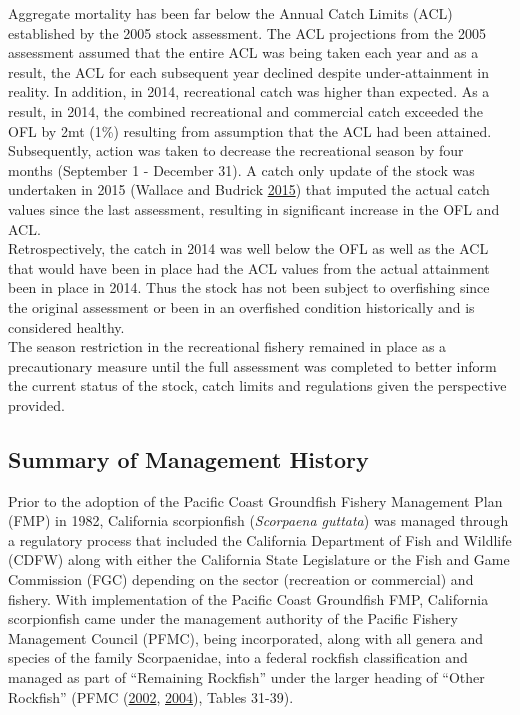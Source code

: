 \documentclass[12pt,]{article}
\begin{document}
Aggregate mortality has been far below the Annual Catch Limits (ACL)
established by the 2005 stock assessment. The ACL projections from the
2005 assessment assumed that the entire ACL was being taken each year
and as a result, the ACL for each subsequent year declined despite
under-attainment in reality. In addition, in 2014, recreational catch
was higher than expected. As a result, in 2014, the combined
recreational and commercial catch exceeded the OFL by 2mt (1\%)
resulting from assumption that the ACL had been attained. Subsequently,
action was taken to decrease the recreational season by four months
(September 1 - December 31). A catch only update of the stock was
undertaken in 2015 (Wallace and Budrick
\protect\hyperlink{ref-Wallace2015}{2015}) that imputed the actual catch
values since the last assessment, resulting in significant increase in
the OFL and ACL.\\
Retrospectively, the catch in 2014 was well below the OFL as well as the
ACL that would have been in place had the ACL values from the actual
attainment been in place in 2014. Thus the stock has not been subject to
overfishing since the original assessment or been in an overfished
condition historically and is considered healthy.\\
The season restriction in the recreational fishery remained in place as
a precautionary measure until the full assessment was completed to
better inform the current status of the stock, catch limits and
regulations given the perspective provided.

\subsection{Summary of Management
History}\label{summary-of-management-history}

Prior to the adoption of the Pacific Coast Groundfish Fishery Management
Plan (FMP) in 1982, California scorpionfish (\emph{Scorpaena guttata})
was managed through a regulatory process that included the California
Department of Fish and Wildlife (CDFW) along with either the California
State Legislature or the Fish and Game Commission (FGC) depending on the
sector (recreation or commercial) and fishery. With implementation of
the Pacific Coast Groundfish FMP, California scorpionfish came under the
management authority of the Pacific Fishery Management Council (PFMC),
being incorporated, along with all genera and species of the family
Scorpaenidae, into a federal rockfish classification and managed as part
of ``Remaining Rockfish'' under the larger heading of ``Other Rockfish''
(PFMC (\protect\hyperlink{ref-PFMC2002}{2002},
\protect\hyperlink{ref-PFMC2004}{2004}), Tables 31-39).
\end{document}
